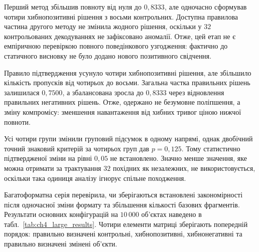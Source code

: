 Перший метод збільшив повноту від нуля до $0{,}8333$, але одночасно сформував чотири хибнопозитивні рішення з восьми контрольних. Доступна правилова частина другого методу не змінила жодного рішення, оскільки у $32$ контрольованих декодуваннях не зафіксовано аномалії. Отже, цей етап не є емпіричною перевіркою повного поведінкового узгодження: фактично до статичного висновку не було додано нового позитивного свідчення.

Правило підтвердження усунуло чотири хибнопозитивні рішення, але збільшило кількість пропусків від чотирьох до восьми. Загальна частка правильних рішень залишилася $0{,}7500$, а збалансована зросла до $0{,}8333$ через відновлення правильних негативних рішень. Отже, одержано не безумовне поліпшення, а зміну компромісу: зменшення навантаження від хибних тривог ціною нижчої повноти.

Усі чотири групи змінили груповий підсумок в одному напрямі, однак двобічний точний знаковий критерій за чотирьох груп дав $p=0{,}125$. Тому статистично підтвердженої зміни на рівні $0{,}05$ не встановлено. Значно менше значення, яке можна отримати за трактування $32$ похідних як незалежних, не використовується, оскільки така одиниця аналізу ігнорує спільне походження.

Багатоформатна серія перевірила, чи зберігаються встановлені закономірності після одночасної зміни формату та збільшення кількості базових фрагментів. Результати основних конфігурацій на $10\,000$ об’єктах наведено в табл.~\ref{tab:ch4_large_results}. Чотири елементи матриці зберігають попередній порядок: правильно визначені контрольні, хибнопозитивні, хибнонегативні та правильно визначені змінені об’єкти.

